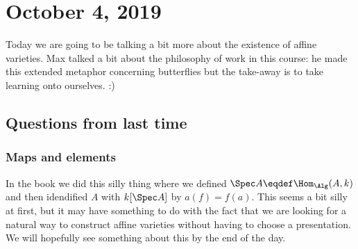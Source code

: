 \documentclass[12pt]{article}
\begin{document}
\section{October 4, 2019}
Today we are going to be talking a bit more about the existence of affine varieties. Max talked a bit about the philosophy of work in this course:
he made this extended metaphor concerning butterflies but the take-away is to take learning onto ourselves. :)

\subsection{Questions from last time}
\subsubsection{Maps and elements}
In the book we did this silly thing where we defined $\Spec A\eqdef\Hom_{\Alg}(A,k)$ and then idendified 
$A$ with $k[\Spec A]$ by $a(f)=f(a)$. This seems a bit silly at first, but it may have something to do with the fact that 
we are looking for a natural way to construct affine varieties without having to choose a presentation. We will hopefully see 
something about this by the end of the day. 
\end{document}
